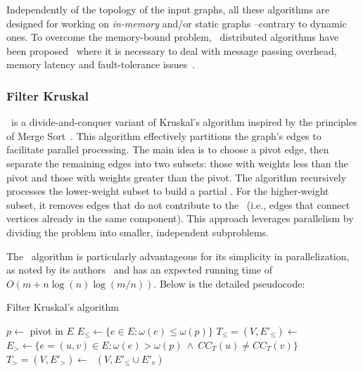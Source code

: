 Independently of the topology of the input graphs, all these algorithms 
are designed for working on \textit{in-memory} and/or static graphs --contrary to dynamic ones. 
To overcome the memory-bound problem, \mst\ distributed algorithms 
have been proposed~\cite{pandurangan2018distributed} where 
it is necessary to deal with  message passing overhead, 
memory latency and fault-tolerance issues~\cite{burkhardt2015cloud}.

\subsubsection{Filter Kruskal \label{sec:filter_kruskal}}

\FKruskal\ is a divide-and-conquer variant of Kruskal's algorithm inspired by the principles of Merge Sort~\cite{Osipov2009}. This algorithm effectively partitions the graph's edges to facilitate parallel processing. The main idea is to choose a pivot edge, then separate the remaining edges into two subsets: those with weights less than the pivot and those with weights greater than the pivot. The algorithm recursively processes the lower-weight subset to build a partial \mst. For the higher-weight subset, it removes edges that do not contribute to the \mst\ (i.e., edges that connect vertices already in the same component). This approach leverages parallelism by dividing the problem into smaller, independent subproblems.

The \FKruskal\ algorithm is particularly advantageous for its simplicity in parallelization, as noted by its authors~\cite{Osipov2009} and has an expected running time of $O(m + n \log (n) \log (m/n))$. Below is the detailed pseudocode:

\begin{algorithm}[H]
\caption{Filter Kruskal's algorithm \label{alg:fkruskal}}
\begin{algorithmic}
            \State \Return {}
        \Else
            \State $p \gets $ pivot in $E$
            \State $E_{\le} \gets \{e \in E : \omega(e) \le \omega(p) \}$
            \State $T_{\le} = (V,E'_{\le}) \gets\ $
            \State $E_{>} \gets \{e=(u,v) \in E : \omega(e) > \omega(p)\ \land\ CC_T(u) \neq CC_T(v)\}$
            \State $T_{>} = (V,E'_{>}) \gets\ $
            \State \Return $(V, E'_{\le} \cup E'_{v})$
        \EndIf
    \EndProcedure
\end{algorithmic}
\end{algorithm}

